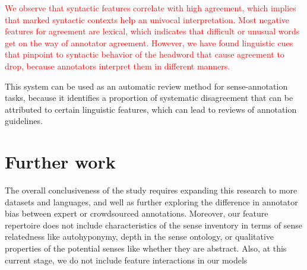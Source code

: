 \documentclass[11pt,a4paper]{article}
\begin{document}
\textcolor{red}{We observe that syntactic features correlate with high agreement, which implies that marked syntactic contexts help an univocal interpretation. Most negative features for agreement are lexical, which indicates that difficult or unusual words get on the way of annotator agreement. However, we have found linguistic cues that pinpoint to syntactic behavior of the headword that cause agreement to drop, because annotators interpret them in different manners. }

This system can be used as an automatic review method for sense-annotation tasks, because it identifies a proportion of systematic disagreement that can be attributed to certain linguistic features, which can lead to reviews of annotation guidelines. 


\section{Further work}
The overall conclusiveness of the study requires expanding this research to more datasets and languages, and well as further exploring the difference in annotator bias between  expert or crowdsourced annotations. Moreover, our feature repertoire does not include characteristics of the sense inventory in terms of sense relatedness like autohyponymy, depth in the sense ontology, or qualitative properties of the potential senses like whether they are abstract. Also, at this current stage, we do not include feature interactions in our models



\end{document}
